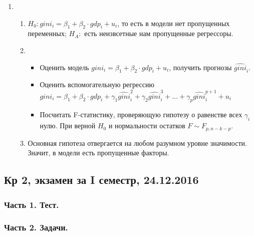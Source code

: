 \documentclass[12pt, a4paper]{article}
\theoremstyle{definition}
\begin{document}
\begin{enumerate}
\item
\begin{enumerate}
\item $H_0: gini_i = \beta_1 + \beta_2 \cdot gdp_i + u_i$, то есть в модели нет пропущенных переменных; $H_A:$ есть неизвсетные нам пропущенные регрессоры.
\item
\begin{itemize}
\item Оценить модель $gini_i = \beta_1 + \beta_2 \cdot gdp_i + u_i$, получить прогнозы $\widehat{gini}_i$.
\item Оценить вспомогательную регрессию $gini_i = \beta_1 + \beta_2 \cdot gdp_i + \gamma_1 \widehat{gini}_i^2 + \gamma_2 \widehat{gini}_i^3 + \ldots + \gamma_p \widehat{gini}_i^{p+1} + u_i$
\item Посчитать F-статистику, проверяющую гипотезу о равенстве всех $\gamma_i$ нулю. При верной $H_0$ и нормальности остатков $F \sim F_{p, n-k-p}$.
\end{itemize}
\item Основная гипотеза отвергается на любом разумном уровне значимости. Значит, в модели есть пропущенные факторы.
\end{enumerate}
\end{enumerate}



\subsection{Кр 2, экзамен за I семестр, 24.12.2016}

\subsubsection*{Часть 1. Тест.}





\subsubsection*{Часть 2. Задачи.}
\end{document}
